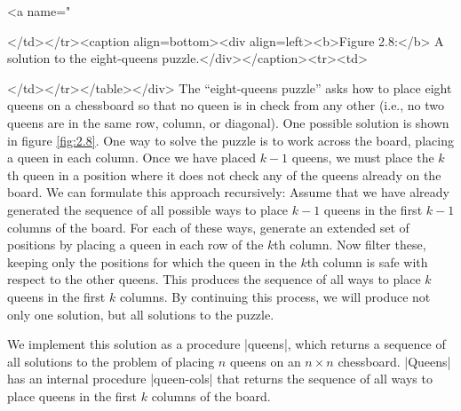 \begin{Exercise}
\begin{Exercise}
\label{exc:2.42}

\begin{figure}
\centering
{}
\end{figure}
<a name="%


</td></tr><caption align=bottom><div align=left><b>Figure 2.8:</b>  A solution to the eight-queens puzzle.</div></caption><tr><td>

</td></tr></table></div>
The ``eight-queens puzzle'' asks how to place eight queens on a
chessboard so that no queen is in check from any other (i.e., no two
queens are in the same row, column, or diagonal).  One possible
solution is shown in figure \ref{fig:2.8}.  One way to solve the
puzzle is to work across the board, placing a queen in each column.
Once we have placed $k - 1$ queens, we must place the $k$th queen in a
position where it does not check any of the queens already on the
board.  We can formulate this approach recursively: Assume that we
have already generated the sequence of all possible ways to place
$k - 1$ queens in the first $k - 1$ columns of the board.  For each of
these ways, generate an extended set of positions by placing a queen
in each row of the $k$th column.  Now filter these, keeping only
the positions for which the queen in the $k$th column is safe with
respect to the other queens.  This produces the sequence of all ways
to place $k$ queens in the first $k$ columns.  By continuing this
process, we will produce not only one solution, but all solutions to
the puzzle.


We implement this solution as a procedure \scheme|queens|, which returns
a sequence of all solutions to the problem of placing $n$ queens on an
$n \times n$ chessboard.  \scheme|Queens| has an internal procedure \scheme|queen-cols| that returns the sequence of all ways to place queens in
the first $k$ columns of the board.


\end{Exercise}
\end{Exercise}
